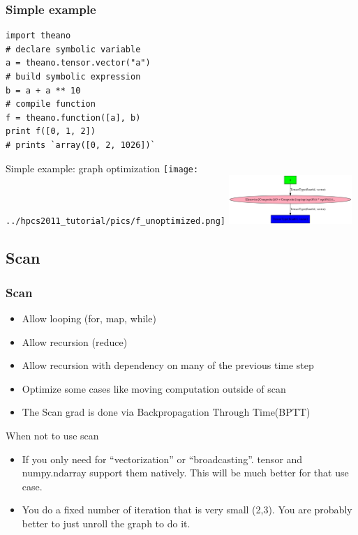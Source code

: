 \documentclass[utf8x,xcolor=pdftex,dvipsnames,table]{beamer}
\begin{document}
\begin{frame}[fragile]
  \frametitle{Simple example}

\begin{lstlisting}
import theano
# declare symbolic variable
a = theano.tensor.vector("a")
# build symbolic expression
b = a + a ** 10
# compile function
f = theano.function([a], b)
print f([0, 1, 2])
# prints `array([0, 2, 1026])`
\end{lstlisting}
\end{frame}

\begin{frame}{Simple example: graph optimization}
\center
\texttt{[image: ../hpcs2011\_tutorial/pics/f\_unoptimized.png]}
\hspace{0.1\textwidth}
\includegraphics[width=0.35\textwidth]{../hpcs2011_tutorial/pics/f_optimized.png}

\end{frame}

\subsection{Scan}
\begin{frame}
  \frametitle{Scan}
\begin{itemize}
\item Allow looping (for, map, while)
\item Allow recursion (reduce)
\item Allow recursion with dependency on many of the previous time step
\item Optimize some cases like moving computation outside of scan
\item The Scan grad is done via Backpropagation Through Time(BPTT)
\end{itemize}
\end{frame}

\begin{frame}{When not to use scan}
\begin{itemize}
\item If you only need for ``vectorization'' or
  ``broadcasting''. tensor and numpy.ndarray support them
  natively. This will be much better for that use case.

\item You do a fixed number of iteration that is very small (2,3). You
  are probably better to just unroll the graph to do it.

\end{itemize}
\end{frame}
\end{document}
